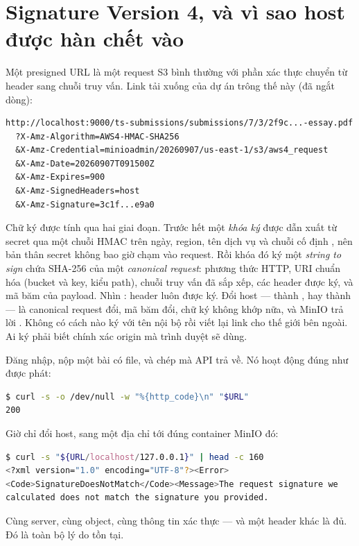 \section{Signature Version 4, và vì sao host được hàn chết vào}
\label{sec:sigv4}

Một presigned URL là một request S3 bình thường với phần xác thực
chuyển từ header sang chuỗi truy vấn. Link tải xuống của dự án trông
thế này (đã ngắt dòng):

\begin{lstlisting}
http://localhost:9000/ts-submissions/submissions/7/3/2f9c...-essay.pdf
  ?X-Amz-Algorithm=AWS4-HMAC-SHA256
  &X-Amz-Credential=minioadmin/20260907/us-east-1/s3/aws4_request
  &X-Amz-Date=20260907T091500Z
  &X-Amz-Expires=900
  &X-Amz-SignedHeaders=host
  &X-Amz-Signature=3c1f...e9a0
\end{lstlisting}

Chữ ký được tính qua hai giai đoạn. Trước hết một \emph{khóa ký} được
dẫn xuất từ secret qua một chuỗi HMAC trên ngày, region, tên dịch vụ và
chuỗi cố định , nên bản thân secret không bao giờ
chạm vào request. Rồi khóa đó ký một \emph{string to sign} chứa SHA-256
của một \emph{canonical request}: phương thức HTTP, URI chuẩn hóa
(bucket và key, kiểu path), chuỗi truy vấn đã sắp xếp, các header được
ký, và mã băm của payload. Nhìn : header
 luôn được ký. Đổi host ---  thành
, hay  thành  --- là
canonical request đổi, mã băm đổi, chữ ký không khớp nữa, và MinIO trả
lời . Không có cách nào ký với tên nội
bộ rồi viết lại link cho thế giới bên ngoài. Ai ký phải biết chính xác
origin mà trình duyệt sẽ dùng.

\begin{handson}
Đăng nhập, nộp một bài có file, và chép  mà API trả
về. Nó hoạt động đúng như được phát:
\begin{lstlisting}[language=bash]
$ curl -s -o /dev/null -w "%{http_code}\n" "$URL"
200
\end{lstlisting}
Giờ chỉ đổi host, sang một địa chỉ tới đúng container MinIO đó:
\begin{lstlisting}[language=bash]
$ curl -s "${URL/localhost/127.0.0.1}" | head -c 160
<?xml version="1.0" encoding="UTF-8"?><Error>
<Code>SignatureDoesNotMatch</Code><Message>The request signature we
calculated does not match the signature you provided.
\end{lstlisting}
Cùng server, cùng object, cùng thông tin xác thực --- và một header
 khác là đủ. Đó là toàn bộ lý do  tồn
tại.
\end{handson}

